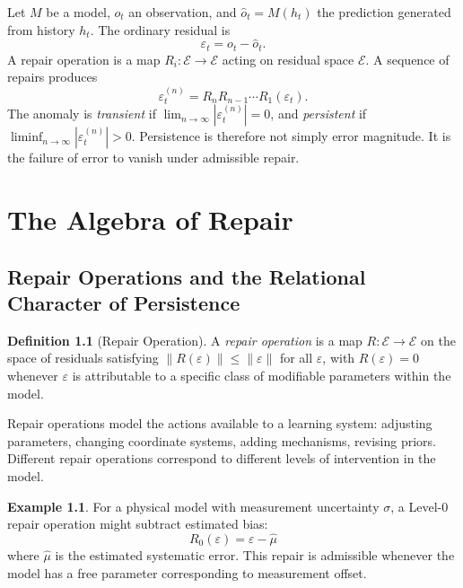 \documentclass[12pt,oneside]{book}
\theoremstyle{plain}
\theoremstyle{definition}
\newtheorem{definition}[theorem]{Definition}
\newtheorem{example}[theorem]{Example}
\theoremstyle{remark}
\newcommand{\eps}{\varepsilon}
\newcommand{\norm}[1]{\left\lVert #1 \right\rVert}
\newcommand{\1}{\mathbf{1}}
\begin{document}
\begin{derivbox}[frametitle={Derivation 1: Residuals and Repair Sequences}]
Let $M$ be a model, $o_t$ an observation, and $\hat{o}_t = M(h_t)$ the prediction generated from history $h_t$. The ordinary residual is
\[
\eps_t = o_t - \hat{o}_t.
\]
A repair operation is a map $R_i : \mathcal{E} \to \mathcal{E}$ acting on residual space $\mathcal{E}$. A sequence of repairs produces
\[
\eps_t^{(n)} = R_n R_{n-1} \cdots R_1(\eps_t).
\]
The anomaly is \emph{transient} if $\lim_{n\to\infty}|\eps_t^{(n)}| = 0$, and \emph{persistent} if $\liminf_{n\to\infty}|\eps_t^{(n)}| > 0$. Persistence is therefore not simply error magnitude. It is the failure of error to vanish under admissible repair.
\end{derivbox}


\chapter{The Algebra of Repair}

\section{Repair Operations and the Relational Character of Persistence}

\begin{definition}[Repair Operation]
A \emph{repair operation} is a map $R : \mathcal{E} \to \mathcal{E}$ on the space of residuals satisfying $\norm{R(\eps)} \leq \norm{\eps}$ for all $\eps$, with $R(\eps) = 0$ whenever $\eps$ is attributable to a specific class of modifiable parameters within the model.
\end{definition}

Repair operations model the actions available to a learning system: adjusting parameters, changing coordinate systems, adding mechanisms, revising priors. Different repair operations correspond to different levels of intervention in the model.

\begin{example}
For a physical model with measurement uncertainty $\sigma$, a Level-0 repair operation might subtract estimated bias:
\[
R_0(\eps) = \eps - \hat{\mu}
\]
where $\hat{\mu}$ is the estimated systematic error. This repair is admissible whenever the model has a free parameter corresponding to measurement offset.
\end{example}
\end{document}
